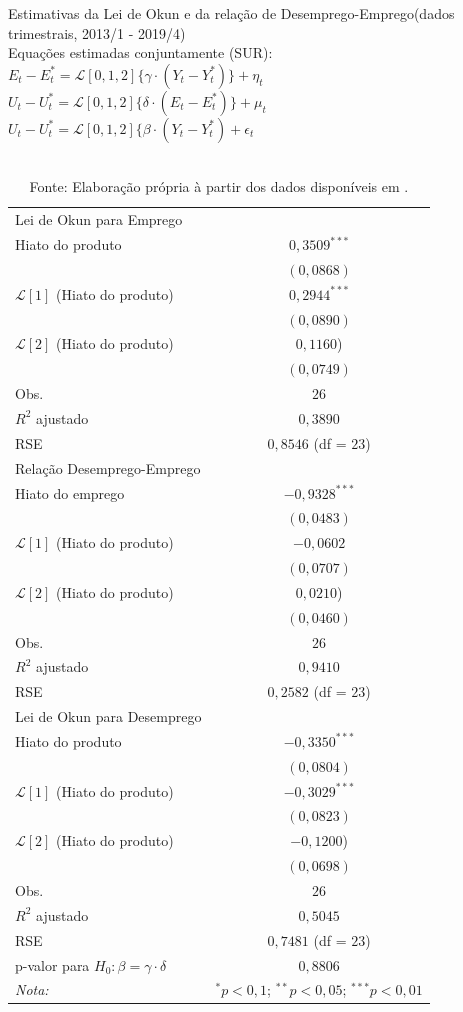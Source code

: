 \documentclass[12pt, openright,oneside, a4paper, english, brazil, section = TITLE, ubsection = Title]{article}
\begin{document}
\begin{table}[H]
\centering
\caption{Estimativas da Lei de Okun e da relação de Desemprego-Emprego(dados trimestrais, 2013/1 - 2019/4) \\
Equações estimadas conjuntamente (SUR): \\
$E_t - E_t^* = \mathcal{L}[0,1,2]\{\gamma \cdot (Y_t - Y_t^*)\} + \eta_t$ \\ 
$U_t - U_t^* = \mathcal{L}[0,1,2]\{\delta \cdot (E_t - E_t^*)\} + \mu_t$ \\
$U_t - U_t^* = \mathcal{L}[0,1,2]\{\beta \cdot (Y_t - Y_t^*) + \epsilon_t$}
\label{tab:sur}
\begin{tabular}{@{}lc@{}}
\toprule
Lei de Okun para Emprego &  \\
Hiato do produto & $0,3509^{***}$ \\
 & $(0,0868)$ \\ $\mathcal{L}[1]$ (Hiato do produto) & $0,2944^{***}$ \\ & $(0,0890)$ \\ $\mathcal{L}[2]$ (Hiato do produto) & $0,1160$) \\ & $(0,0749)$ \\ 
Obs. & $26$ \\
$R^2$ ajustado & $0,3890$ \\
RSE & $0,8546$ (df = $23$) \\ \midrule
Relação Desemprego-Emprego &  \\
Hiato do emprego & $-0,9328^{***}$ \\
 & $(0,0483)$ \\ $\mathcal{L}[1]$ (Hiato do produto) & $-0,0602$ \\ & $(0,0707)$ \\ $\mathcal{L}[2]$ (Hiato do produto) & $0,0210$) \\ & $(0,0460)$ \\ 
Obs. & $26$ \\
$R^2$ ajustado & $0,9410$ \\
RSE & $0,2582$ (df = $23$) \\ \midrule
Lei de Okun para Desemprego &  \\
Hiato do produto & $-0,3350^{***}$ \\
 & $(0,0804)$ \\ $\mathcal{L}[1]$ (Hiato do produto) & $-0,3029^{***}$ \\ & $(0,0823)$ \\ $\mathcal{L}[2]$ (Hiato do produto) & $-0,1200$) \\ & $(0,0698)$ \\ 
Obs. & $26$ \\
$R^2$ ajustado & $0,5045$ \\
RSE & $0,7481$ (df = $23$) \\ \midrule
p-valor para $H_0: \beta = \gamma \cdot \delta$ & $0,8806$ \\ \midrule
\textit{Nota:} & $^*p < 0,1$; $^{**}p < 0,05$; $^{***}p < 0,01$
\end{tabular}
\caption*{\\ Fonte: Elaboração própria à partir dos dados disponíveis em \cite{IPEA2020}.}
\end{table}
\end{document}
